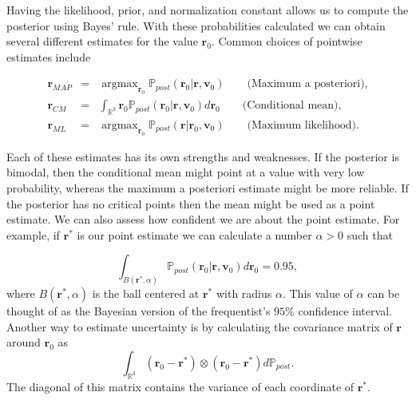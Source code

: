 \documentclass[12pt]{book}
\newcommand{\post}{\mathbb{P}_{post}}
\newcommand{\argmax}{\mathop{\mathrm{argmax}}}
\begin{document}
Having the likelihood, prior, and normalization constant allows us to compute the posterior using
Bayes' rule. With these probabilities calculated 
we can obtain  several different estimates for the value $\textbf{r}_{0}$.  
Common choices of pointwise estimates include

%
%
\begin{eqnarray}\label{eqnpointestimates}
\textbf{r}_{MAP}&=&\argmax_{\textbf{r}_{0}}\post(\textbf{r}_{0}|\textbf{r},\textbf{v}_{0}) 
\qquad\text{(Maximum a posteriori),}\\
\textbf{r}_{CM}&=&\int_{\mathbb{R}^{3}}\textbf{r}_{0}\post(\textbf{r}_{0}|\textbf{r},\textbf{v}_{0})d\textbf{r}_{0}
\qquad\text{(Conditional mean)}, \\
\textbf{r}_{ML}&=&\argmax_{\textbf{r}_{0}}\post(\textbf{r}|\textbf{r}_{0},\textbf{v}_{0})
\qquad\text{(Maximum likelihood).}
\end{eqnarray} 

Each  of these estimates has its own strengths and weaknesses. If the posterior is bimodal, then the conditional
mean might point at a value with very low probability, whereas the maximum a posteriori estimate might be more 
reliable. If the posterior has no critical points then the mean might be used as a point estimate. We can 
also assess how confident we are about the point estimate. For example, if $\textbf{r}^{*}$ is our point
estimate we can calculate a number $\alpha>0$ such that

\begin{equation}\label{eqnBayesConf}
\int_{B(\textbf{r}^{*},\alpha)}\post(\textbf{r}_{0}|\textbf{r},\textbf{v}_{0})d\textbf{r}_{0}=0.95,
\end{equation}
where $B(\textbf{r}^{*},\alpha)$ is the ball centered at $\textbf{r}^{*}$ with radius $\alpha$. This 
value of $\alpha$ can be thought of as  the Bayesian version 
of the frequentist's $95\%$ confidence interval.
Another way to estimate uncertainty is by calculating the covariance matrix of $\textbf{r}$
around $\textbf{r}_{0}$ as
\begin{equation*}
\int_{\mathbb{R}^{3}}(\textbf{r}_{0}-\textbf{r}^{*})\otimes(\textbf{r}_{0}-\textbf{r}^{*})d\post.
\end{equation*}
\newline
The diagonal of this matrix  contains the variance of each coordinate of $\textbf{r}^{*}$.
\end{document}

